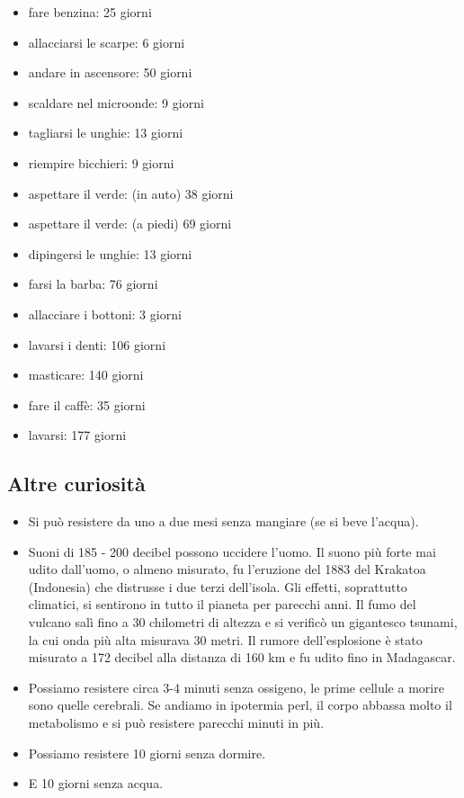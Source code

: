 \begin{itemize}
\item fare benzina: 25 giorni
\item allacciarsi le scarpe: 6 giorni
\item andare in ascensore: 50 giorni
\item scaldare nel microonde: 9 giorni
\item tagliarsi le unghie: 13 giorni
\item riempire bicchieri: 9 giorni
\item aspettare il verde: (in auto) 38 giorni
\item aspettare il verde: (a piedi) 69 giorni
\item dipingersi le unghie: 13 giorni
\item farsi la barba: 76 giorni
\item allacciare i bottoni: 3 giorni
\item lavarsi i denti: 106 giorni
\item masticare: 140 giorni
\item fare il caffè: 35 giorni
\item lavarsi: 177 giorni
\end{itemize}

\bigskip

\subsection{Altre curiosità}

\bigskip

\begin{itemize}
\item Si può resistere da uno a due mesi senza mangiare (se si beve l'acqua).
\item Suoni di 185 - 200 decibel possono uccidere l'uomo. Il suono più forte mai udito
dall'uomo, o almeno misurato, fu l'eruzione del 1883 del Krakatoa (Indonesia) che distrusse i due
terzi dell'isola. Gli effetti, soprattutto climatici, si sentirono in tutto il pianeta per parecchi anni. Il fumo del
vulcano salì fino a 30 chilometri di altezza e si verificò un gigantesco tsunami, la cui onda più alta misurava 30
metri. Il rumore dell'esplosione è stato misurato a 172 decibel alla distanza di 160 km e fu udito
fino in Madagascar.
\item Possiamo resistere circa 3-4 minuti senza ossigeno, le prime cellule a morire sono quelle cerebrali. Se andiamo in
ipotermia perl, il corpo abbassa molto il metabolismo e si può resistere parecchi minuti in più.
\item Possiamo resistere 10 giorni senza dormire.
\item E 10 giorni senza acqua.
\end{itemize}
